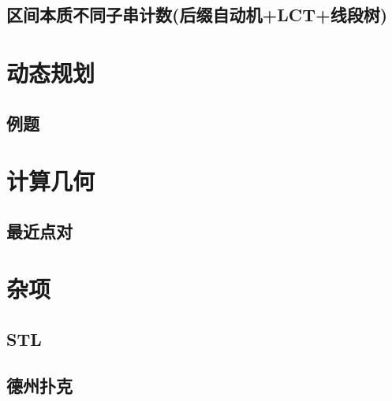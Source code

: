 \documentclass[a4paper]{article}
\begin{document}
\begin{multicols}{2}
			\subsection[区间本质不同子串计数]{区间本质不同子串计数(后缀自动机+LCT+线段树)}
				

		\section{动态规划}
			
			\subsection{例题}
				

		\section{计算几何}
			
			\subsection{最近点对}
				

		\section{杂项}
			\subsection{STL}
				
			
			\subsection{德州扑克}
				

	\end{multicols}

	

	


\end{document}
